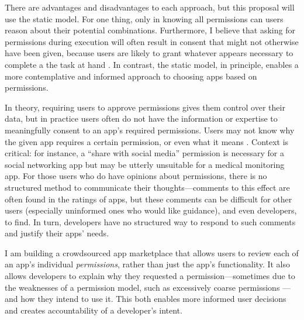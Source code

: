 \documentclass[11pt]{article}
\begin{document}
There are advantages and disadvantages to each approach, but
this proposal will use the static model. For one thing, only in 
knowing all permissions can users reason about their potential
combinations. Furthermore, I believe that asking for permissions
during execution will often result in consent that might not otherwise
have been given, because users are likely to grant whatever appears
necessary to complete a the task at hand \cite{phisher-wanings-SIGCHI08}. 
In contrast, the static
model, in principle, enables a more contemplative and
informed approach to choosing apps based on permissions.

In theory, requiring users to approve permissions gives them control over their 
data, but in practice users often do not have the 
information or expertise to meaningfully consent to an 
app's required permissions. Users may not
know why the given app requires a certain permission, or
even what it means \cite{android-attention-SOUPS12}. 
Context is critical:
for instance, 
a ``share with social media'' permission is necessary for a social
networking app but may be utterly
unsuitable for a medical monitoring app. 
For those users who do have opinions about permissions, 
there is no structured method to
communicate their thoughts---comments to this effect are often found in
the ratings of apps, but these comments can be difficult for other
users (especially uninformed ones who would like guidance), and even
developers, to find. In turn, developers have no structured way to
respond to such comments and justify their apps' needs.

I am building a crowdsourced app marketplace that allows users to review
each of an app's individual \emph{permissions}, rather than just the app's functionality. 
It also allows developers to
explain why they requested a permission---sometimes due to the
weaknesses of a permission model, such as excessively coarse permissions
\cite{permission-tracking-UBICOMM12}---and how they intend to use it. This both enables more
informed user decisions and creates accountability of a developer's intent.
\end{document}
